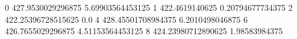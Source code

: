 0 427.9530029296875 5.69903564453125
1 422.4619140625 0.20794677734375
2 422.25396728515625 0.0
4 428.45501708984375 6.2010498046875
6 426.7655029296875 4.51153564453125
8 424.23980712890625 1.98583984375
